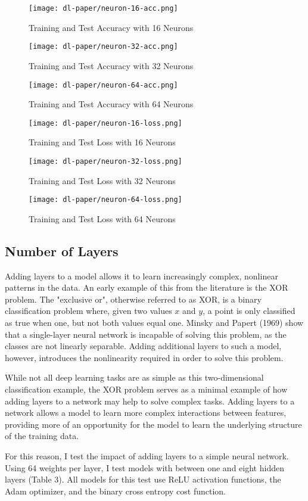 \documentclass[12pt]{article}  %
\theoremstyle{definition}
\theoremstyle{remark}
\begin{document}
\begin{figure}[!h]
  \texttt{[image: dl-paper/neuron-16-acc.png]}
  \caption{Training and Test Accuracy with 16 Neurons}\label{small-neuron}
\endminipage\hfill
{}
  \texttt{[image: dl-paper/neuron-32-acc.png]}
  \caption{Training and Test Accuracy with 32 Neurons}\label{med-neuron}
\endminipage\hfill
{}%
  \texttt{[image: dl-paper/neuron-64-acc.png]}
  \caption{Training and Test Accuracy with 64 Neurons}\label{large-neuron}
\endminipage
\end{figure}

\begin{figure}[!h]
  \texttt{[image: dl-paper/neuron-16-loss.png]}
  \caption{Training and Test Loss with 16 Neurons}\label{small-neuron-loss}
\endminipage\hfill
{}
  \texttt{[image: dl-paper/neuron-32-loss.png]}
  \caption{Training and Test Loss with 32 Neurons}\label{med-neuron-loss}
\endminipage\hfill
{}%
  \texttt{[image: dl-paper/neuron-64-loss.png]}
  \caption{Training and Test Loss with 64 Neurons}\label{large-neuron-loss}
\endminipage
\end{figure}

\subsection{Number of Layers}

\par Adding layers to a model allows it to learn increasingly complex, nonlinear patterns in the data. An early example of this from the literature is the XOR problem. The "exclusive or", otherwise referred to as XOR, is a binary classification problem where, given two values $x$ and $y$, a point is only classified as true when one, but not both values equal one. Minsky and Papert (1969) show that a single-layer neural network is incapable of solving this problem, as the classes are not linearly separable. Adding additional layers to such a model, however, introduces the nonlinearity required in order to solve this problem. 
\par While not all deep learning tasks are as simple as this two-dimensional classification example, the XOR problem serves as a minimal example of how adding layers to a network may help to solve complex tasks. Adding layers to a network allows a model to learn more complex interactions between features, providing more of an opportunity for the model to learn the underlying structure of the training data. 
\par For this reason, I test the impact of adding layers to a simple neural network. Using 64 weights per layer, I test models with between one and eight hidden layers (Table 3). All models for this test use ReLU activation functions, the Adam optimizer, and the binary cross entropy cost function. 
\end{document}
